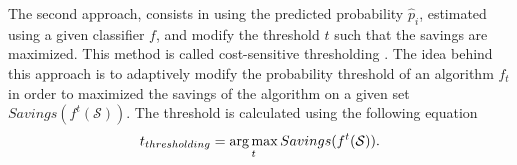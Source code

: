   The second approach, consists in using the predicted probability $\hat p_i$, estimated using a 
  given classifier $f$, and   modify the threshold $t$  such that the savings are maximized. 
  This method is called cost-sensitive thresholding \citep{Sheng2006}. The idea behind this approach 
  is to adaptively modify the probability threshold of an algorithm $f_t$ in order to maximized the 
  savings of the algorithm on a given set $Savings(f^t(\mathcal{S}))$. The threshold is calculated 
  using the following equation
  \begin{equation}
   t_{thresholding} = \operatorname*{arg\,max}_t Savings(f^t(\mathcal{S})).
  \end{equation}

  